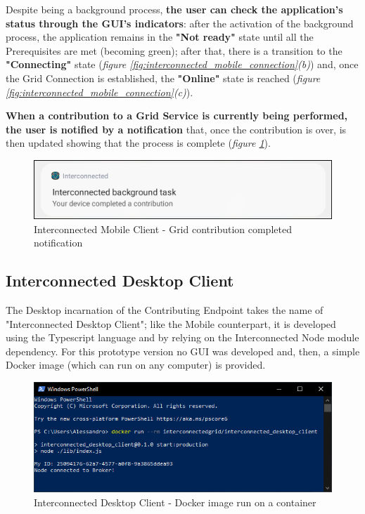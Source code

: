 Despite being a background process, \textbf{the user can check the application's status through the GUI's indicators}: after the activation of the background process, the application remains in the \textbf{"Not ready"} state until all the Prerequisites are met (becoming green); after that, there is a transition to the \textbf{"Connecting"} state (\textit{figure \ref{fig:interconnected_mobile_connection}(b)}) and, once the Grid Connection is established, the \textbf{"Online"} state is reached (\textit{figure \ref{fig:interconnected_mobile_connection}(c)}).

\textbf{When a contribution to a Grid Service is currently being performed, the user is notified by a notification} that, once the contribution is over, is then updated showing that the process is complete (\textit{figure \ref{fig:notification_completed}}).

\begin{figure}[!ht]
    \centering
    \includegraphics[scale=0.35]{document/chapters/chapter_7/images/notification_completed.png}
    \caption{Interconnected Mobile Client - Grid contribution completed notification}
    \label{fig:notification_completed}
\end{figure}

\subsection{Interconnected Desktop Client}
The Desktop incarnation of the Contributing Endpoint takes the name of "Interconnected Desktop Client"; like the Mobile counterpart, it is developed using the Typescript language and by relying on the Interconnected Node module dependency. For this prototype version no GUI was developed and, then, a simple Docker image (which can run on any computer) is provided.

\begin{figure}[!ht]
    \centering
    \includegraphics[scale=0.8]{document/chapters/chapter_7/images/interconnected_desktop.png}
    \caption{Interconnected Desktop Client - Docker image run on a container}
    \label{fig:interconnected_desktop}
\end{figure}

